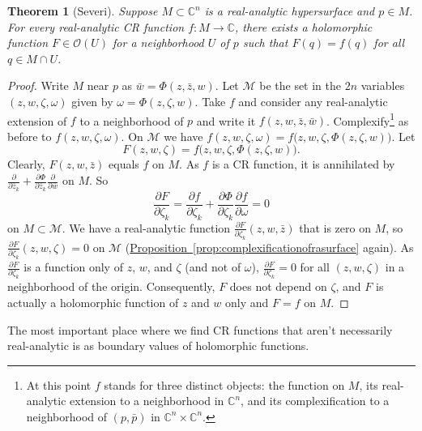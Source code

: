 \documentclass[12pt,openany]{book}
\newcommand{\C}{{\mathbb{C}}}
\newcommand{\sM}{{\mathscr{M}}}
\newcommand{\sO}{{\mathscr{O}}}
\theoremstyle{plain}
\newtheorem{thm}{Theorem}[section]
\theoremstyle{remark}
\theoremstyle{definition}
\theoremstyle{exercise}
\theoremstyle{example}
\newcommand{\propref}[1]{\hyperref[#1]{Proposition~\ref*{#1}}}
\begin{document}
\begin{thm}[Severi] \label{thm:severi}
Suppose $M \subset \C^n$ is a real-analytic hypersurface and $p \in M$.
For every real-analytic CR function $f \colon M \to \C$, there exists
a holomorphic function $F \in \sO(U)$ for a neighborhood $U$ of $p$
such that $F(q) = f(q)$ for all $q \in M \cap U$.
\end{thm}

\begin{proof}
Write $M$ near $p$ as $\bar{w} = \Phi(z,\bar{z},w)$.
Let $\sM$ be the set in the $2n$ variables $(z,w,\zeta,\omega)$ given by
$\omega = \Phi(z,\zeta,w)$.
Take $f$ and consider any real-analytic extension of $f$
to a neighborhood of $p$ and write it
$f(z,w,\bar{z},\bar{w})$.  Complexify\footnote{At this point
$f$ stands for three distinct objects:
the function on $M$, its real-analytic extension to
a neighborhood in $\C^n$, and its complexification
to a neighborhood of $(p,\bar{p})$ in $\C^n \times \C^n$.}
as before to
$f(z,w,\zeta,\omega)$.  On $\sM$ we have
$f(z,w,\zeta,\omega) = f\bigl(z,w,\zeta,\Phi(z,\zeta,w)\bigr)$.  Let
\begin{equation*}
F(z,w,\zeta) = f\bigl(z,w,\zeta,\Phi(z,\zeta,w)\bigr).
\end{equation*}
Clearly, $F(z,w,\bar{z})$ equals $f$ on $M$.
As $f$ is a CR function, it is annihilated by
$\frac{\partial}{\partial \bar{z}_k}
+\frac{\partial \Phi}{\partial \bar{z}_k} \frac{\partial}{\partial
\bar{w}}$ on $M$.  So
\begin{equation*}
\frac{\partial F}{\partial \zeta_k}
=
\frac{\partial f}{\partial \zeta_k}
+\frac{\partial \Phi}{\partial \zeta_k} \frac{\partial f}{\partial
\omega}
=
0
\end{equation*}
on $M \subset \sM$.  We have a real-analytic function
$\frac{\partial F}{\partial \zeta_k}(z,w,\bar{z})$
that is zero on $M$, so
$\frac{\partial F}{\partial \zeta_k}(z,w,\zeta) = 0$
on $\sM$
(\propref{prop:complexificationofrasurface} again).
As $\frac{\partial F}{\partial \zeta_k}$ is a function only of
$z$, $w$, and $\zeta$ (and not of $\omega$),
$\frac{\partial F}{\partial \zeta_k} = 0$
for all
$(z,w,\zeta)$ in a neighborhood of the origin.  Consequently,
$F$ does not depend on $\zeta$, and
$F$ is actually a holomorphic function of $z$ and $w$ only
and $F = f$ on $M$.
\end{proof}

The most important place where we find CR functions that aren't necessarily
real-analytic is as boundary values of holomorphic functions.
\end{document}
